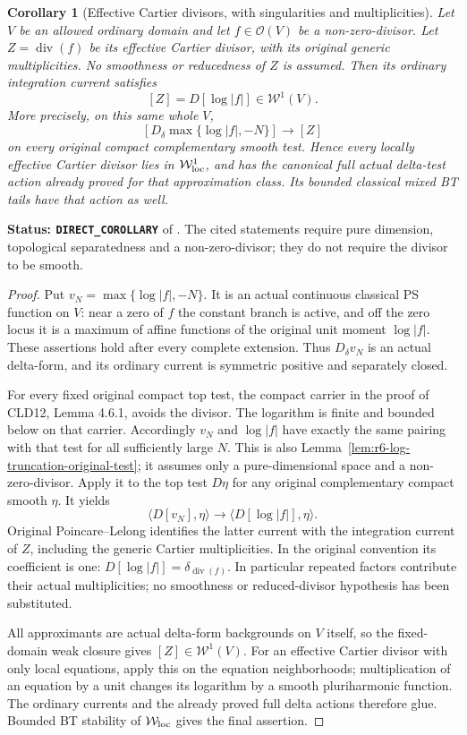 \documentclass[11pt,a4paper]{article}
\numberwithin{equation}{section}
\newtheorem{corollary}[theorem]{Corollary}
\theoremstyle{definition}
\theoremstyle{remark}
\begin{document}
\begin{corollary}[Effective Cartier divisors, with singularities and multiplicities]
\label{cor:r6-cartier-delta-background}
Let $V$ be an allowed ordinary domain and let $f\in\mathcal O(V)$
be a non-zero-divisor. Let $Z=\operatorname{div}(f)$ be its
effective Cartier divisor, with its original generic multiplicities.
No smoothness or reducedness of $Z$ is assumed. Then its ordinary
integration current satisfies
\[
 [Z]=D[\log|f|]\in\mathcal W^1(V).
\]
More precisely, on this same whole $V$,
\[
       [D_\delta\max\{\log|f|,-N\}]\longrightarrow[Z]
\]
on every original compact complementary smooth test. Hence every
locally effective Cartier divisor lies in $\mathcal W^1_{\rm loc}$,
and has the canonical full actual delta-test action already proved
for that approximation class. Its bounded classical mixed BT tails
have that action as well.
\end{corollary}

\noindent\textbf{Status: \texttt{DIRECT\_COROLLARY}} of
\cite[Lemma 4.6.1, 4.6.3 and Theorem 4.6.5, printed
pp.~72--74]{CLD12}. The cited statements require pure dimension,
topological separatedness and a non-zero-divisor; they do not
require the divisor to be smooth.

\begin{proof}
Put $v_N=\max\{\log|f|,-N\}$. It is an actual continuous
classical PS function on $V$: near a zero of $f$ the constant
branch is active, and off the zero locus it is a maximum of affine
functions of the original unit moment $\log|f|$. These assertions
hold after every complete extension. Thus $D_\delta v_N$ is an
actual delta-form, and its ordinary current is symmetric positive
and separately closed.

For every fixed original compact top test, the compact carrier in
the proof of CLD12, Lemma 4.6.1, avoids the divisor. The logarithm
is finite and bounded below on that carrier. Accordingly $v_N$
and $\log|f|$ have exactly the same pairing with that test for
all sufficiently large $N$. This is also
Lemma~\ref{lem:r6-log-truncation-original-test}; it assumes only
a pure-dimensional space and a non-zero-divisor. Apply it to the
top test $D\eta$ for any original complementary compact smooth
$\eta$. It yields
\[
     \langle D[v_N],\eta\rangle
                 \longrightarrow\langle D[\log|f|],\eta\rangle.
\]
Original Poincare--Lelong identifies the latter current with the
integration current of $Z$, including the generic Cartier
multiplicities. In the original convention its coefficient is one:
$D[\log|f|]=\delta_{\operatorname{div}(f)}$. In particular repeated
factors contribute their actual multiplicities; no smoothness or
reduced-divisor hypothesis has been substituted.

All approximants are actual delta-form backgrounds on $V$ itself,
so the fixed-domain weak closure gives $[Z]\in\mathcal W^1(V)$.
For an effective Cartier divisor with only local equations, apply
this on the equation neighborhoods; multiplication of an equation
by a unit changes its logarithm by a smooth pluriharmonic function.
The ordinary currents and the already proved full delta actions
therefore glue. Bounded BT stability of $\mathcal W_{\rm loc}$
gives the final assertion.
\end{proof}
\end{document}
